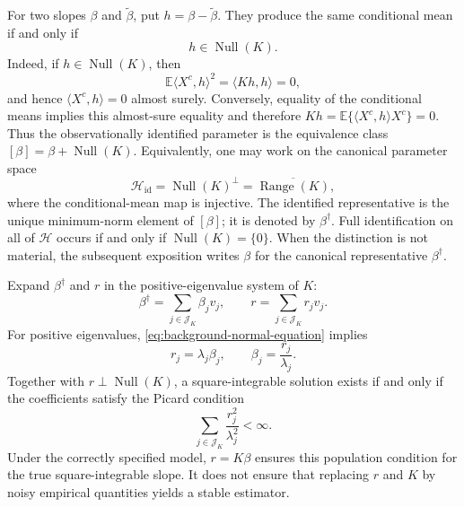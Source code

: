 For two slopes $\beta$ and $\widetilde\beta$, put
$h=\beta-\widetilde\beta$.  They produce the same conditional mean if and only
if
\begin{equation}
    h\in\operatorname{Null}(K).
    \label{eq:identified-equivalence}
\end{equation}
Indeed, if $h\in\operatorname{Null}(K)$, then
\begin{equation}
    \mathbb E\langle X^c,h\rangle^2=\langle Kh,h\rangle=0,
\end{equation}
and hence $\langle X^c,h\rangle=0$ almost surely.  Conversely, equality of
the conditional means implies this almost-sure equality and therefore
$Kh=\mathbb E\{\langle X^c,h\rangle X^c\}=0$.  Thus the observationally
identified parameter is the equivalence class
$[\beta]=\beta+\operatorname{Null}(K)$.  Equivalently, one may work on the
canonical parameter space
\begin{equation}
    \mathcal H_{\mathrm{id}}=\operatorname{Null}(K)^\perp
    =\overline{\operatorname{Range}(K)},
    \label{eq:identified-parameter-space}
\end{equation}
where the conditional-mean map is injective.  The identified representative is
the unique minimum-norm element of $[\beta]$; it is denoted by
$\beta^\dagger$.  Full identification on all of $\mathcal H$ occurs if and only
if $\operatorname{Null}(K)=\{0\}$.  When the distinction is not material, the subsequent exposition writes $\beta$ for the canonical representative $\beta^\dagger$.

Expand $\beta^\dagger$ and $r$ in the positive-eigenvalue system of $K$:
\begin{equation}
    \beta^\dagger=\sum_{j\in\mathcal J_K}\beta_jv_j,
    \qquad
    r=\sum_{j\in\mathcal J_K}r_jv_j.
    \label{eq:beta-r-spectral-expansions}
\end{equation}
For positive eigenvalues, \eqref{eq:background-normal-equation} implies
\begin{equation}
    r_j=\lambda_j\beta_j,
    \qquad
    \beta_j=\frac{r_j}{\lambda_j}.
    \label{eq:spectral-inverse-coefficients}
\end{equation}
Together with $r\perp\operatorname{Null}(K)$, a square-integrable solution
exists if and only if the coefficients satisfy the Picard condition
\begin{equation}
    \sum_{j\in\mathcal J_K}\frac{r_j^2}{\lambda_j^2}<\infty.
    \label{eq:picard-condition}
\end{equation}
Under the correctly specified model, $r=K\beta$ ensures this population condition for the true square-integrable slope. It does not ensure that replacing $r$ and $K$ by noisy empirical quantities yields a stable estimator.

